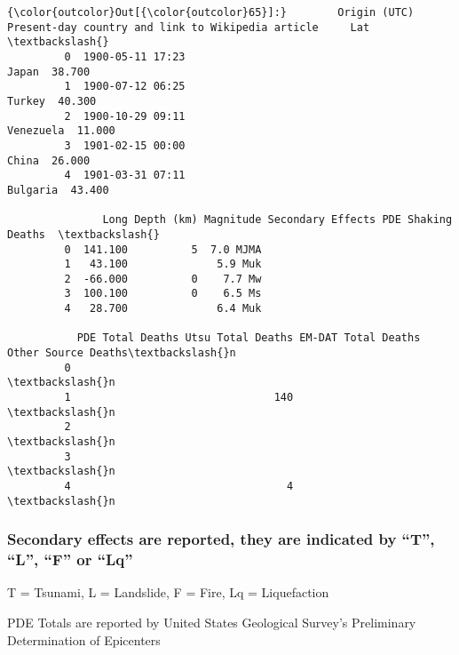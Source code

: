 \documentclass[11pt]{article}
\begin{document}
\begin{Verbatim}[commandchars=\\\{\}]
{\color{outcolor}Out[{\color{outcolor}65}]:}        Origin (UTC) Present-day country and link to Wikipedia article     Lat  \textbackslash{}
         0  1900-05-11 17:23                                             Japan  38.700   
         1  1900-07-12 06:25                                            Turkey  40.300   
         2  1900-10-29 09:11                                         Venezuela  11.000   
         3  1901-02-15 00:00                                             China  26.000   
         4  1901-03-31 07:11                                          Bulgaria  43.400   
         
               Long Depth (km) Magnitude Secondary Effects PDE Shaking Deaths  \textbackslash{}
         0  141.100          5  7.0 MJMA                                        
         1   43.100              5.9 Muk                                        
         2  -66.000          0    7.7 Mw                                        
         3  100.100          0    6.5 Ms                                        
         4   28.700              6.4 Muk                                        
         
           PDE Total Deaths Utsu Total Deaths EM-DAT Total Deaths Other Source Deaths\textbackslash{}n  
         0                                                                           \textbackslash{}n  
         1                                140                                        \textbackslash{}n  
         2                                                                           \textbackslash{}n  
         3                                                                           \textbackslash{}n  
         4                                  4                                        \textbackslash{}n  
\end{Verbatim}
            
    \subsubsection{Secondary effects are reported, they are indicated by
``T'', ``L'', ``F'' or
``Lq''}\label{secondary-effects-are-reported-they-are-indicated-by-t-l-f-or-lq}

T = Tsunami, L = Landslide, F = Fire, Lq = Liquefaction

    PDE Totals are reported by United States Geological Survey's Preliminary
Determination of Epicenters
\end{document}
